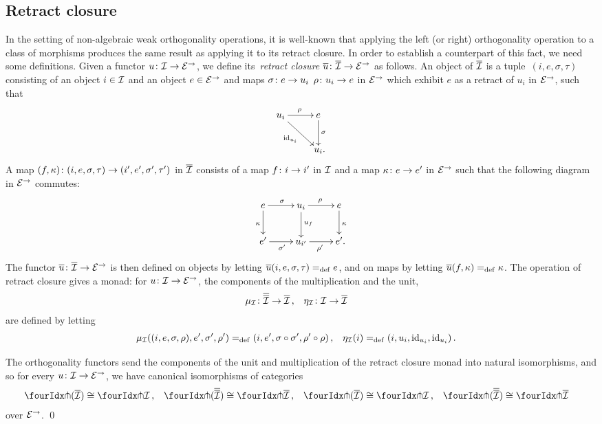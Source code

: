 \documentclass[reqno,10pt,a4paper,oneside]{amsart}
\begin{document}
\subsection*{Retract closure}
In the setting of non-algebraic weak orthogonality operations, it is well-known that applying the left (or right) orthogonality operation to a class of morphisms produces the same result as applying it to its retract closure.
In order to establish a counterpart of this fact, we need some definitions.
Given a functor $u \co \cal{I} \to \calE^\to$, we define its~\emph{retract closure} $\overline{u} \co \overline{\cal{I}} \to \catE^\to$ as follows.
An object of $\overline{\cal{I}}$ is a tuple~$(i, e, \sigma, \tau)$ consisting of an object $i \in \cal{I}$ and an object $e \in \cal{E}^\to$ and maps $\sigma \co e \rightarrow u_i$ $\rho \co u_i \rightarrow e$ in $\cal{E}^\to$ which exhibit $e$ as a retract of $u_i$ in $\catE^\to$, \ie such that
\[
\xymatrix{
u_i \ar[r]^\rho \ar[dr]_{\id_{u_i}} & e \ar[d]^{\sigma} \\
  & u_i \rlap{.}}
  \]
A map $(f, \kappa) \co (i, e, \sigma, \tau) \to (i', e', \sigma', \tau')$ in $\overline{\cal{I}}$ consists of a map $f \co i \to i'$ in $\cal{I}$ and a map $\kappa \co e \rightarrow e'$ in $\cal{E}^\to$ such that the following diagram in $\cal{E}^\to$ commutes:
\[
\xymatrix{
  e
  \ar[r]^{\sigma}
  \ar[d]_{\kappa}
&
  u_i
  \ar[r]^{\rho}
  \ar[d]^{u_f}
&
  e
  \ar[d]^{\kappa}
\\
  e'
  \ar[r]_{\sigma'}
&
  u_{i'}
  \ar[r]_{\rho'}
&
  e'
\rlap{.}}
\]
The functor $\overline{u} \co \overline{\cal{I}} \to \catE^\to$ is then defined on objects by letting $\overline{u}(i, e, \sigma, \tau) \defeq e$, and on maps by letting $\overline{u}(f, \kappa) \defeq \kappa$.
The operation of retract closure gives a monad: for $u \co \cal{I} \to \catE^\to$, the components of the multiplication and the unit,
\[
\begin{aligned}
  \mu_\cal{I} &\co \overline{\overline{\cal{I}}} \to \overline{\cal{I}}
\, , &
  \eta_\cal{I} &\co \cal{I} \to \overline{\cal{I}}
\end{aligned}
\]
are defined by letting
\[
\begin{aligned}
  \mu_\cal{I}((i, e, \sigma, \rho), e', \sigma', \rho') &\defeq (i, e', \sigma \cc \sigma', \rho' \cc \rho)
\, , &
  \eta_\cal{I}(i) &\defeq (i, u_i, \id_{u_i}, \id_{u_i})
\, .
\end{aligned}
\]

\begin{proposition} \label{retract-closure}
The orthogonality functors send the components of the unit and multiplication of the retract closure monad into natural isomorphisms, and so for every $u \co \cal{I} \to \catE^\to$, we have canonical isomorphisms of categories
\[
\begin{aligned}
  \liftr{(\overline{\cal{I}})} &\iso \liftr{\cal{I}}
\, ,&
  \liftr{(\overline{\overline{\cal{I}}})} &\iso \liftr{\overline{\cal{I}}}
\, ,&
  \liftl{(\overline{\cal{I}})} &\iso \liftl{\cal{I}}
\, ,&
 \liftl{(\overline{\overline{\cal{I}}})} &\iso \liftl{\overline{\cal{I}}}
\end{aligned}
\]
over $\catE^\to$.
\qed
\end{proposition}
\end{document}
